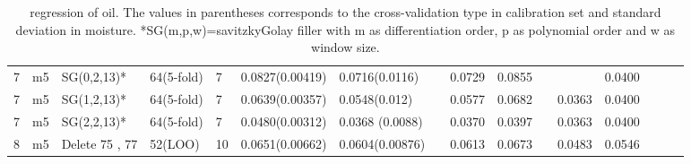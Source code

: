 \documentclass[a4paper,12pt,titlepage]{article} %
\numberwithin{equation}{section}  %
\begin{document}
\begin{landscape}
\begin{table}[]
\begin{tabular}{llllllllllllllll}
				7                    & m5                   & SG(0,2,13)*           & 64(5-fold) & 7  & 0.0827(0.00419) & 0.0716(0.0116)  &   & 0.0729 & 0.0855 &   &        & 0.0400         &         &    &                 \\
				7                    & m5                   & SG(1,2,13)*           & 64(5-fold) & 7  & 0.0639(0.00357) & 0.0548(0.012)   &   & 0.0577 & 0.0682 &   & 0.0363 & 0.0400         &         &    &                 \\
				7                    & m5                   & SG(2,2,13)*           & 64(5-fold) & 7  & 0.0480(0.00312) & 0.0368 (0.0088) &   & 0.0370 & 0.0397 &   & 0.0363 & 0.0400         &         &    &                 \\
				8                    & m5                   & Delete 75 , 77       & 52(LOO)    & 10 & 0.0651(0.00662) & 0.0604(0.00876) &   & 0.0613 & 0.0673 &   & 0.0483 & 0.0546         &         &    &                 
			\end{tabular}
			
			\caption{regression of oil. The values in parentheses corresponds to the cross-validation type in calibration set and standard deviation in moisture.
			*SG(m,p,w)=savitzkyGolay filler with m as differentiation order, p as polynomial order and w as window size.}
			\label{tab:oil}
		\end{table}


\end{landscape}
\end{document}

